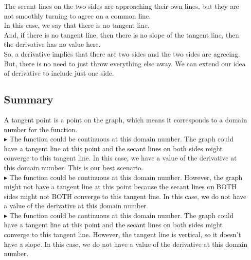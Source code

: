 \documentclass{ximera}
\begin{document}
The secant lines on the two sides are approaching their own lines, but they are not smoothly turning to agree on a common line. \\


In this case, we say that there is no tangent line. \\

And, if there is no tangent line, then there is no slope of the tangent line, then the derivative has no value here. \\







So, a derivative implies that there are two sides and the two sides are agreeing. \\



But, there is no need to just throw everything else away.  We can extend our idea of derivative to include just one side. \\ 






\subsection*{Summary}


A tangent point is a point on the graph, which means it corresponds to a domain number for the function. \\


\textbf{\textcolor{blue!55!black}{$\blacktriangleright$}}  The function could be continuous at this domain number. The graph could have a tangent line at this point and the secant lines on both sides might converge to this tangent line.  In this case, we have a value of the derivative at this domain number. This is our best scenario. \\


\textbf{\textcolor{blue!55!black}{$\blacktriangleright$}}  The function could be continuous at this domain number.  However, the graph might not have a tangent line at this point because the secant lines on BOTH sides might not BOTH converge to this tangent line.  In this case, we do not have a value of the derivative at this domain number. \\



\textbf{\textcolor{blue!55!black}{$\blacktriangleright$}}  The function could be continuous at this domain number. The graph could have a tangent line at this point and the secant lines on both sides might converge to this tangent line.  However, the tangent line is vertical, so it doesn't have a slope. In this case, we do not have a value of the derivative at this domain number. \\
\end{document}
